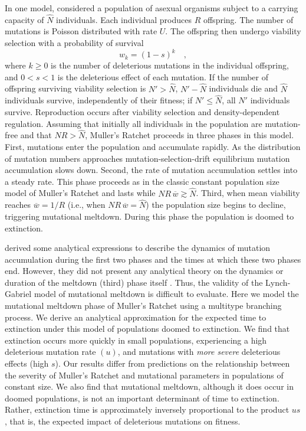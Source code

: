 \documentclass[9pt,lineno]{elife}
\begin{document}
In one model, \citet{lyn93} considered a population of asexual organisms subject to a carrying capacity of $\widehat N$ individuals.  Each individual produces $R$ offspring.  The number of mutations is Poisson distributed with rate $U$.  The offspring then undergo viability selection with a probability of survival
%
\begin{equation}
  w_k=(1-s)^{k} \quad ,
  \label{eq:fit}
\end{equation}
%
where
$k \geq 0$ is the number of deleterious mutations in the individual offspring,  
and $0 < s < 1$ is the deleterious effect of each mutation. 
If the number of offspring surviving viability selection is $N' > \widehat N$, $N' - \widehat N$ individuals die and $\widehat N$ individuals survive, independently of their fitness; if $N' \leq \widehat N$, all $N'$ individuals survive.  
Reproduction occurs after viability selection and density-dependent regulation.  Assuming that initially all individuals in the population are mutation-free and that $N R > \widehat N$, Muller's Ratchet proceeds in three phases in this model.  
First, mutations enter the population and accumulate rapidly.  As the distribution of mutation numbers approaches mutation-selection-drift equilibrium mutation accumulation slows down.
Second, the rate of mutation accumulation settles into a steady rate.  This phase proceeds as in the classic constant population size model of Muller's Ratchet \citep{Haigh_The_1978} and lasts while $N R \, \overline w \gtrsim \widehat N$.
Third, when mean viability reaches $\overline w = 1/R$ (i.e., when $N R \, \overline w = \widehat N$) the population size begins to decline, triggering mutational meltdown.  During this phase the population is doomed to extinction.


\citet{lyn93} derived some analytical expressions to describe the dynamics of mutation accumulation during the first two phases and the times at which these two phases end.  
However, they did not present any analytical theory on the dynamics or duration of the meltdown (third) phase itself \citep[see also][]{Gabriel_MULLER_1993, lyn95}.
Thus, the validity of the Lynch-Gabriel model of mutational meltdown is difficult to evaluate.
Here we model the mutational meltdown phase of Muller's Ratchet using a multitype branching process.
We derive an analytical approximation for the expected time to extinction under this model
of populations doomed to extinction.  
We find that extinction occurs more quickly in small populations, 
experiencing a high deleterious mutation rate $(u)$, 
and mutations with \emph{more severe} deleterious effects (high $s$).  
Our results differ from predictions on the relationship between the severity of Muller's Ratchet and mutational parameters in populations of constant size.
We also find that mutational meltdown, 
although it does occur in doomed populations,
is not an important determinant of time to extinction. 
Rather, extinction time is approximately inversely proportional to the product $us$, that is, 
the expected impact of deleterious mutations on fitness.
\end{document}
